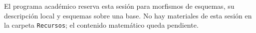 \begin{nota}
El programa académico reserva esta sesión para morfismos de esquemas, su descripción local y esquemas sobre una base. No hay materiales de esta sesión en la carpeta \texttt{Recursos}; el contenido matemático queda pendiente.
\end{nota}
